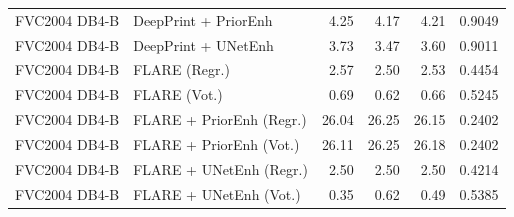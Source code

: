 {\begin{longtable}{llrrrr}
FVC2004 DB4-B & DeepPrint + PriorEnh & 4.25 & 4.17 & 4.21 & 0.9049 \\
FVC2004 DB4-B & DeepPrint + UNetEnh & 3.73 & 3.47 & 3.60 & 0.9011 \\
FVC2004 DB4-B & FLARE (Regr.) & 2.57 & 2.50 & 2.53 & 0.4454 \\
FVC2004 DB4-B & FLARE (Vot.) & 0.69 & 0.62 & 0.66 & 0.5245 \\
FVC2004 DB4-B & FLARE + PriorEnh (Regr.) & 26.04 & 26.25 & 26.15 & 0.2402 \\
FVC2004 DB4-B & FLARE + PriorEnh (Vot.) & 26.11 & 26.25 & 26.18 & 0.2402 \\
FVC2004 DB4-B & FLARE + UNetEnh (Regr.) & 2.50 & 2.50 & 2.50 & 0.4214 \\
FVC2004 DB4-B & FLARE + UNetEnh (Vot.) & 0.35 & 0.62 & 0.49 & 0.5385 \\
\end{longtable}
}
